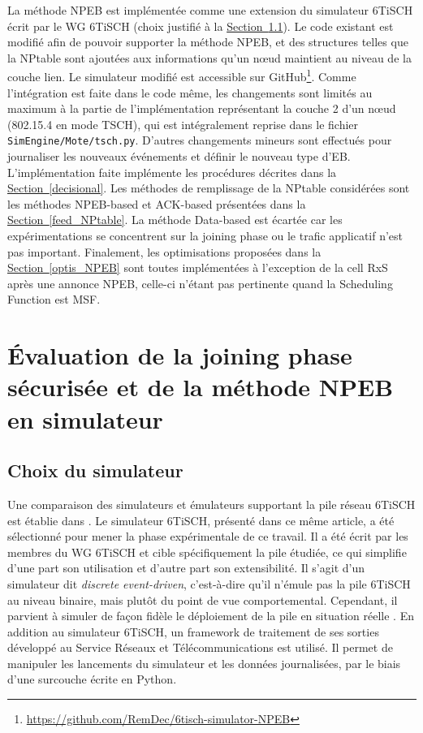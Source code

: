 \documentclass[]{report}
\newcommand{\wordlink}[2]{\hyperref[#2]{#1~\ref{#2}}}
\begin{document}
La méthode NPEB est implémentée comme une extension du simulateur 6TiSCH écrit par le WG 6TiSCH \cite{simulating-6TiSCH} (choix justifié à la \wordlink{Section}{choice_sim}). Le code existant est modifié afin de pouvoir supporter la méthode NPEB, et des structures telles que la NPtable sont ajoutées aux informations qu'un nœud maintient au niveau de la couche lien. Le simulateur modifié est accessible sur GitHub\footnote{\url{https://github.com/RemDec/6tisch-simulator-NPEB}}. Comme l'intégration est faite dans le code même, les changements sont limités au maximum à la partie de l'implémentation représentant la couche 2 d'un nœud (802.15.4 en mode TSCH), qui est intégralement reprise dans le fichier \texttt{SimEngine/Mote/tsch.py}. D'autres changements mineurs sont effectués pour journaliser les nouveaux événements et définir le nouveau type d'EB.\\

L'implémentation faite implémente les procédures décrites dans la \wordlink{Section}{decisional}. Les méthodes de remplissage de la NPtable considérées sont les méthodes NPEB-based et ACK-based présentées dans la \wordlink{Section}{feed_NPtable}. La méthode Data-based est écartée car les expérimentations se concentrent sur la joining phase ou le trafic applicatif n'est pas important. Finalement, les optimisations proposées dans la \wordlink{Section}{optis_NPEB} sont toutes implémentées à l'exception de la cell RxS après une annonce NPEB, celle-ci n'étant pas pertinente quand la Scheduling Function est MSF.


\chapter{Évaluation de la joining phase sécurisée et de la méthode NPEB en simulateur}
\label{chap_exp}
\newpage

\section{Choix du simulateur}
\label{choice_sim}

Une comparaison des simulateurs et émulateurs supportant la pile réseau 6TiSCH est établie dans \cite{simulating-6TiSCH}. Le simulateur 6TiSCH, présenté dans ce même article, a été sélectionné pour mener la phase expérimentale de ce travail. Il a été écrit par les membres du WG 6TiSCH et cible spécifiquement la pile étudiée, ce qui simplifie d'une part son utilisation et d'autre part son extensibilité. Il s'agit d'un simulateur dit \textit{discrete event-driven}, c'est-à-dire qu'il n'émule pas la pile 6TiSCH au niveau binaire, mais plutôt du point de vue comportemental. Cependant, il parvient à simuler de façon fidèle le déploiement de la pile en situation réelle \cite{simulating-6TiSCH}. En addition au simulateur 6TiSCH, un framework de traitement de ses sorties développé au Service Réseaux et Télécommunications est utilisé. Il permet de manipuler les lancements du simulateur et les données journalisées, par le biais d'une surcouche écrite en Python.
\end{document}

